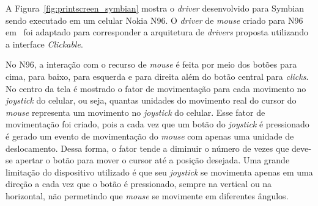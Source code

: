 A Figura~\ref{fig:printscreen_symbian} mostra o \emph{driver} desenvolvido para Symbian sendo executado em um celular Nokia N96. O \emph{driver} de \emph{mouse} criado para N96 em~\cite{buzeto2010} foi adaptado para corresponder a arquitetura de \emph{drivers} proposta utilizando a interface \emph{Clickable}.

No N96, a interação com o recurso de \emph{mouse} é feita por meio dos botões para cima, para baixo, para esquerda e para direita além do botão central para \emph{clicks}. No centro da tela é mostrado o fator de movimentação para cada movimento no \emph{joystick} do celular, ou seja, quantas unidades do movimento real do cursor do \emph{mouse} representa um movimento no \emph{joystick} do celular. Esse fator de movimentação foi criado, pois a cada vez que um botão do \emph{joystick} é pressionado é gerado um evento de movimentação do \emph{mouse} com apenas uma unidade de deslocamento. Dessa forma, o fator tende a diminuir o número de vezes que deve-se apertar o botão para mover o cursor até a posição desejada. Uma grande limitação do dispositivo utilizado é que seu \emph{joystick} se movimenta apenas em uma direção a cada vez que o botão é pressionado, sempre na vertical ou na horizontal, não permetindo que \emph{mouse} se movimente em diferentes ângulos.

